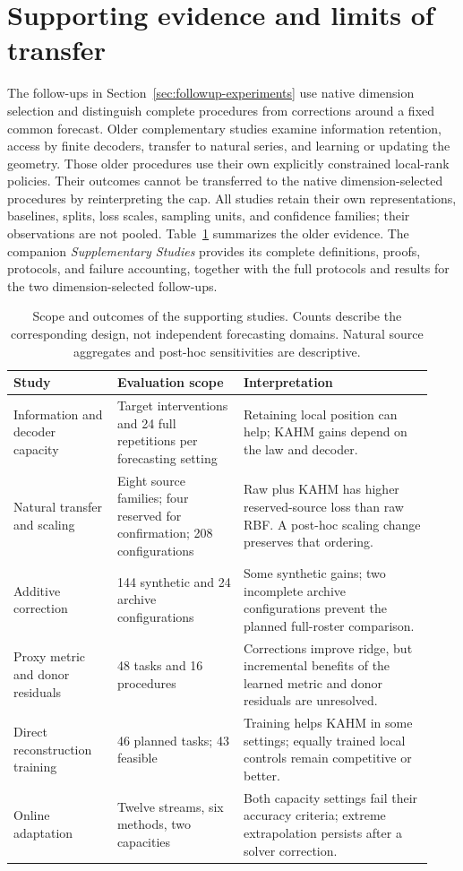 \section{Supporting evidence and limits of transfer}
\label{sec:supporting-evidence}

The follow-ups in Section~\ref{sec:followup-experiments} use native
dimension selection and distinguish complete procedures from corrections
around a fixed common forecast. Older complementary studies examine
information retention, access by finite decoders, transfer to natural
series, and learning or updating the geometry. Those older procedures
use their own explicitly constrained local-rank policies. Their outcomes
cannot be transferred to the native dimension-selected procedures by
reinterpreting the cap. All studies retain their own representations,
baselines, splits, loss scales, sampling units, and confidence families;
their observations are not pooled. Table~\ref{tab:supporting-evidence}
summarizes the older evidence. The companion \emph{Supplementary Studies}
provides its complete definitions, proofs, protocols, and failure
accounting, together with the full protocols and results for the two
dimension-selected follow-ups.

\begin{table}[t]
\centering\small
\caption{Scope and outcomes of the supporting studies. Counts describe
the corresponding design, not independent forecasting domains. Natural
source aggregates and post-hoc sensitivities are descriptive.}
\label{tab:supporting-evidence}
\begin{tabular}{@{}p{0.23\linewidth}p{0.28\linewidth}p{0.42\linewidth}@{}}
\toprule
Study & Evaluation scope & Interpretation \\
\midrule
Information and decoder capacity & Target interventions and 24 full
repetitions per forecasting setting & Retaining local position can help;
KAHM gains depend on the law and decoder. \\
Natural transfer and scaling & Eight source families; four reserved for
confirmation; 208 configurations & Raw plus KAHM has higher reserved-source
loss than raw RBF. A post-hoc scaling change preserves that ordering. \\
Additive correction & 144 synthetic and 24 archive configurations & Some
synthetic gains; two incomplete archive configurations prevent the planned
full-roster comparison. \\
Proxy metric and donor residuals & 48 tasks and 16 procedures & Corrections
improve ridge, but incremental benefits of the learned metric and donor
residuals are unresolved. \\
Direct reconstruction training & 46 planned tasks; 43 feasible & Training
helps KAHM in some settings; equally trained local controls remain
competitive or better. \\
Online adaptation & Twelve streams, six methods, two capacities & Both
capacity settings fail their accuracy criteria; extreme extrapolation
persists after a solver correction. \\
\bottomrule
\end{tabular}
\end{table}

